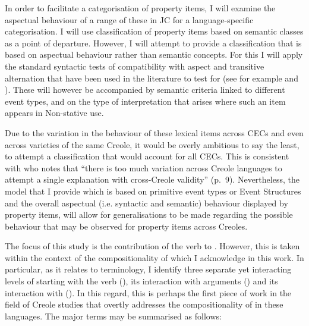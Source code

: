 In order to facilitate a categorisation of property items, I will examine the
aspectual behaviour of a range of these in JC for a language-specific
categorisation.  I will use  classification of property
items based on  semantic classes as a point of departure.
However, I will attempt to provide a classification that is based on aspectual
behaviour rather than semantic concepts.  For this I will apply the standard
syntactic tests of compatibility with  aspect and transitive
alternation that have been used in the literature to test for  (see for
example \citealt{Jaganauth1987} and \citealt{Winford1993}).  These will however be
accompanied by semantic criteria linked to different event types, and on the
type of interpretation that arises where such an item appears in Non-stative
use.

Due to the variation in the behaviour of these lexical items across CECs and
even across varieties of the same Creole, it would be overly ambitious to say
the least, to attempt a classification that would account for all CECs. This is
consistent with \citet{Kouwenberg1996} who notes that ``there is too much
variation across Creole languages to attempt a single explanation with
cross-Creole validity'' (p.~9).  Nevertheless, the model that I provide which is
based on primitive event types or Event Structures and the overall aspectual
(i.e. syntactic and semantic) behaviour displayed by property items, will allow
for generalisations to be made regarding the possible behaviour that may be
observed for property items across Creoles.

The focus of this study is the contribution of the verb to .  However,
this is taken within the context of the compositionality of  which I
acknowledge in this work.  In particular, as it relates to terminology, I
identify three separate yet interacting levels of  starting with the verb
(), its interaction with arguments () and its
interaction with  ().  In this regard, this is
perhaps the first piece of work in the field of Creole studies that overtly
addresses the compositionality of  in these languages.  The major terms
may be summarised as follows:

